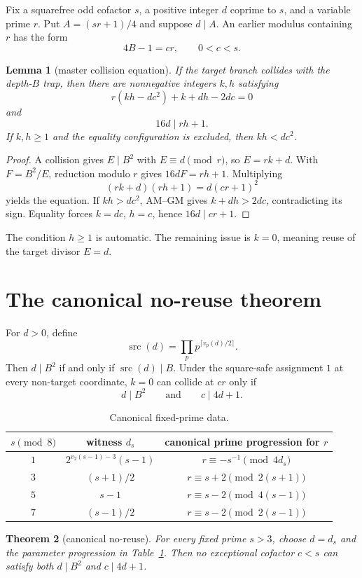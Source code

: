 \documentclass[11pt]{article}
\newtheorem{theorem}{Theorem}
\newtheorem{lemma}[theorem]{Lemma}
\theoremstyle{definition}
\newcommand{\src}{\operatorname{src}}
\begin{document}
Fix a squarefree odd cofactor $s$, a positive integer $d$ coprime to $s$, and a variable prime $r$. Put $A=(sr+1)/4$ and suppose $d\mid A$. An earlier modulus containing $r$ has the form
\[
4B-1=cr,\qquad 0<c<s.
\]

\begin{lemma}[master collision equation]\label{lem:master}
If the target branch collides with the depth-$B$ trap, then there are nonnegative integers $k,h$ satisfying
\[
r(kh-dc^2)+k+dh-2dc=0
\]
and
\[
16d\mid rh+1.
\]
If $k,h\ge1$ and the equality configuration is excluded, then $kh<dc^2$.
\end{lemma}

\begin{proof}
A collision gives $E\mid B^2$ with $E\equiv d\pmod r$, so $E=rk+d$. With $F=B^2/E$, reduction modulo $r$ gives $16dF=rh+1$. Multiplying
\[
(rk+d)(rh+1)=d(cr+1)^2
\]
yields the equation. If $kh>dc^2$, AM--GM gives $k+dh>2dc$, contradicting its sign. Equality forces $k=dc$, $h=c$, hence $16d\mid cr+1$.
\end{proof}

The condition $h\ge1$ is automatic. The remaining issue is $k=0$, meaning reuse of the target divisor $E=d$.

\section{The canonical no-reuse theorem}
For $d>0$, define
\[
\src(d)=\prod_p p^{\lceil v_p(d)/2\rceil}.
\]
Then $d\mid B^2$ if and only if $\src(d)\mid B$. Under the square-safe assignment $1$ at every non-target coordinate, $k=0$ can collide at $cr$ only if
\[
d\mid B^2\qquad\text{and}\qquad c\mid4d+1.
\]

\begin{table}[h]
\centering
\begin{tabular}{c|c|c}
$s\pmod8$ & witness $d_s$ & canonical prime progression for $r$ \\
\hline
$1$ & $2^{v_2(s-1)-3}(s-1)$ & $r\equiv-s^{-1}\pmod{4d_s}$ \\
$3$ & $(s+1)/2$ & $r\equiv s+2\pmod{2(s+1)}$ \\
$5$ & $s-1$ & $r\equiv s-2\pmod{4(s-1)}$ \\
$7$ & $(s-1)/2$ & $r\equiv s-2\pmod{2(s-1)}$
\end{tabular}
\caption{Canonical fixed-prime data.}
\label{tab:canonical}
\end{table}

\begin{theorem}[canonical no-reuse]\label{thm:noreuse}
For every fixed prime $s>3$, choose $d=d_s$ and the parameter progression in Table~\ref{tab:canonical}. Then no exceptional cofactor $c<s$ can satisfy both $d\mid B^2$ and $c\mid4d+1$.
\end{theorem}
\end{document}
